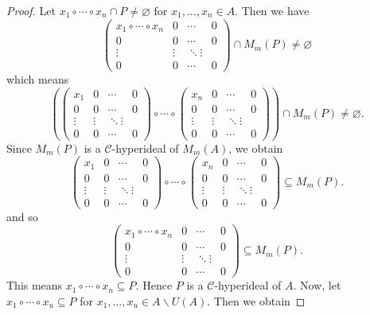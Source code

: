 \documentclass[preprint,review,10pt]{amsart}
\theoremstyle{definition}
\theoremstyle{remark}
\numberwithin{equation}{section}
\begin{document}
\begin{proof}
Let $x_1 \circ \cdots \circ x_n \cap P \neq \varnothing$ for $x_1,\ldots,x_n \in A$. Then we have 
\[\begin{pmatrix}
x_1 \circ \cdots \circ x_n & 0 & \cdots & 0 \\
0 & 0 & \cdots & 0 \\
\vdots & \vdots & \ddots \vdots \\
0 & 0 & \cdots & 0 
\end{pmatrix}
\cap M_m(P) \neq \varnothing\]
which means 
\[(\begin{pmatrix}
x_1 & 0 & \cdots & 0\\
0 & 0 & \cdots & 0\\
\vdots & \vdots & \ddots \vdots\\
0 & 0 & \cdots & 0
\end{pmatrix}
\circ \cdots \circ
\begin{pmatrix}
x_n & 0 & \cdots & 0\\
0 & 0 & \cdots & 0\\
\vdots & \vdots & \ddots \vdots\\
0 & 0 & \cdots & 0
\end{pmatrix}) \cap M_m(P) \neq \varnothing.
\]
Since $M_m(P)$ is a $\mathcal{C}$-hyperideal of $M_m(A)$, we obtain \[\begin{pmatrix}
x_1 & 0 & \cdots & 0\\
0 & 0 & \cdots & 0\\
\vdots & \vdots & \ddots \vdots\\
0 & 0 & \cdots & 0
\end{pmatrix}
\circ \cdots \circ
\begin{pmatrix}
x_n & 0 & \cdots & 0\\
0 & 0 & \cdots & 0\\
\vdots & \vdots & \ddots \vdots\\
0 & 0 & \cdots & 0
\end{pmatrix} \subseteq M_m(P).
\]
and so 
\[\begin{pmatrix}
x_1 \circ \cdots \circ x_n & 0 & \cdots & 0 \\
0 & 0 & \cdots & 0 \\
\vdots & \vdots & \ddots \vdots \\
0 & 0 & \cdots & 0 
\end{pmatrix}
\subseteq  M_m(P).\]
This means $x_1 \circ \cdots \circ x_n \subseteq P$. Hence $P$ is a $\mathcal{C}$-hyperideal of $A$.
Now, let $x_1 \circ \cdots \circ x_u \subseteq P$ for $x_1, \ldots , x_u \in A \backslash U(A)$. Then we obtain

\end{proof}
\end{document}
